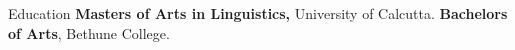 \begin{rubric}{Education}
%
	\textbf{Masters of Arts in Linguistics,} University of Calcutta.
%
%
	\textbf{Bachelors of Arts}, Bethune College.
% 
\end{rubric}